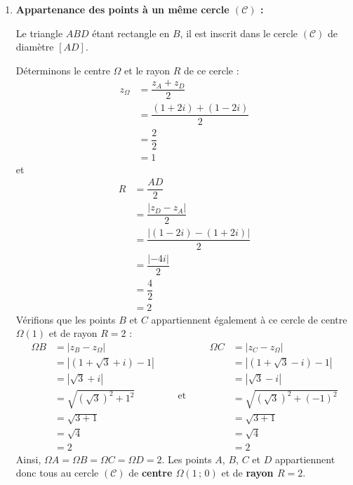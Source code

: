 \documentclass[12pt,a4paper]{article}
\begin{document}
\begin{enumerate}
\begin{enumerate}
        \item \textbf{Appartenance des points à un même cercle $(\mathcal{C})$ :}
        
        Le triangle $ABD$ étant rectangle en $B$, il est inscrit dans le cercle $(\mathcal{C})$ de diamètre $[AD]$.
        
        Déterminons le centre $\Omega$ et le rayon $R$ de ce cercle :
        $$
        \begin{aligned}
            z_{\Omega} &= \dfrac{z_A + z_D}{2} \\
            &= \dfrac{(1 + 2i) + (1 - 2i)}{2} \\
            &= \dfrac{2}{2} \\
            &= 1
        \end{aligned}
        $$
        et
        $$
        \begin{aligned}
            R &= \dfrac{AD}{2} \\
            &= \dfrac{|z_D - z_A|}{2} \\
            &= \dfrac{|(1 - 2i) - (1 + 2i)|}{2} \\
            &= \dfrac{|-4i|}{2} \\
            &= \dfrac{4}{2} \\
            &= 2
        \end{aligned}
        $$
        Vérifions que les points $B$ et $C$ appartiennent également à ce cercle de centre $\Omega(1)$ et de rayon $R = 2$ :
        $$
        \begin{aligned}
            \Omega B &= |z_B - z_{\Omega}| \\
            &= |(1 + \sqrt{3} + i) - 1| \\
            &= |\sqrt{3} + i| \\
            &= \sqrt{(\sqrt{3})^2 + 1^2} \\
            &= \sqrt{3 + 1} \\
            &= \sqrt{4} \\
            &= 2
        \end{aligned}
        \qquad \text{et} \qquad
        \begin{aligned}
            \Omega C &= |z_C - z_{\Omega}| \\
            &= |(1 + \sqrt{3} - i) - 1| \\
            &= |\sqrt{3} - i| \\
            &= \sqrt{(\sqrt{3})^2 + (-1)^2} \\
            &= \sqrt{3 + 1} \\
            &= \sqrt{4} \\
            &= 2
        \end{aligned}
        $$
        Ainsi, $\Omega A = \Omega B = \Omega C = \Omega D = 2$. Les points $A$, $B$, $C$ et $D$ appartiennent donc tous au cercle $(\mathcal{C})$ de \textbf{centre $\Omega(1 \,;\, 0)$} et de \textbf{rayon $R = 2$}.
    \end{enumerate}


\end{enumerate}
\end{document}
